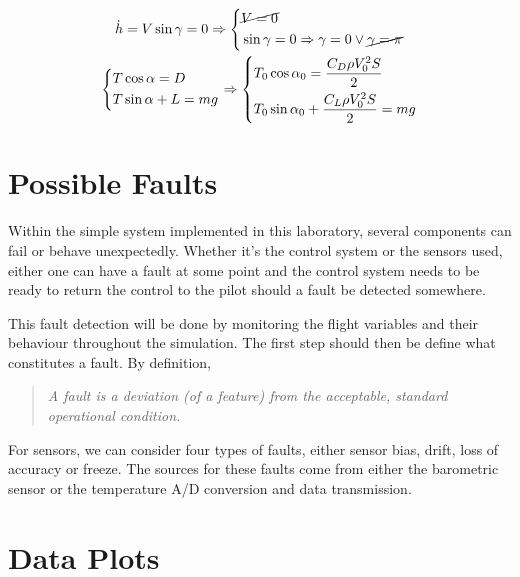 \documentclass[english,palatino]{ist-report}
\begin{document}
\begin{gather*}
	\dot{h} = V\sin\gamma = 0 \Rightarrow \left\{\begin{aligned}
		&\cancel{V = 0} \\
		&\sin\gamma = 0 \Rightarrow \gamma = 0 \vee \cancel{\gamma = \pi}
	\end{aligned}\right. \\
	\left\{\begin{aligned}
		&T\cos\alpha = D \\
		&T\sin\alpha + L = mg
	\end{aligned}\right. \Rightarrow \left\{\begin{aligned}
		&T_0\cos{\alpha_0} = \frac{C_D\rho V_0^2S}{2} \\
		&T_0\sin{\alpha_0} + \frac{C_L\rho V_0^2S}{2} = mg
	\end{aligned}\right.
\end{gather*}

\section{Possible Faults}

Within the simple system implemented in this laboratory, several components can fail or behave unexpectedly. Whether it's the control system or the sensors used, either one can have a fault at some point and the control system needs to be ready to return the control to the pilot should a fault be detected somewhere.

This fault detection will be done by monitoring the flight variables and their behaviour throughout the simulation. The first step should then be define what constitutes a fault. By definition,
\begin{quote} \itshape
	A fault is a deviation (of a feature) from the acceptable, standard operational condition.
\end{quote}
For sensors, we can consider four types of faults, either sensor bias, drift, loss of accuracy or freeze. The sources for these faults come from either the barometric sensor or the temperature A/D conversion and data transmission.

\listoftodos

\pagebreak
\appendix

\section{Data Plots}
\end{document}
